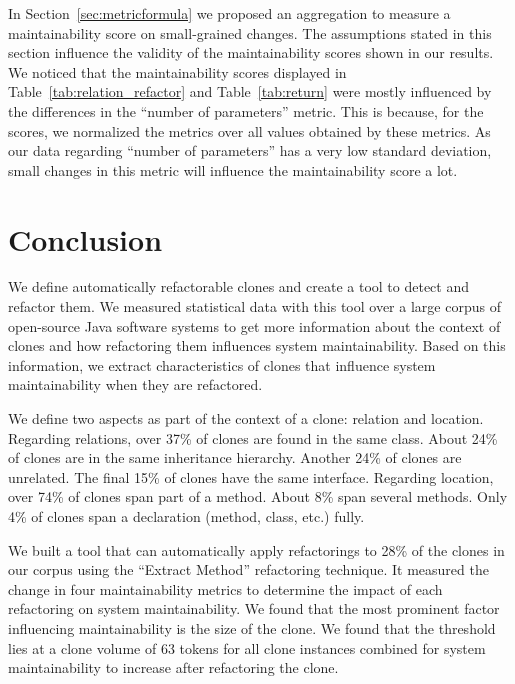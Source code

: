 \documentclass[sigconf,review,anonymous]{acmart}
\begin{document}
In Section~\ref{sec:metricformula} we proposed an aggregation to measure a maintainability score on small-grained changes. The assumptions stated in this section influence the validity of the maintainability scores shown in our results. We noticed that the maintainability scores displayed in Table~\ref{tab:relation_refactor} and Table~\ref{tab:return} were mostly influenced by the differences in the ``number of parameters'' metric. This is because, for the scores, we normalized the metrics over all values obtained by these metrics. As our data regarding ``number of parameters'' has a very low standard deviation, small changes in this metric will influence the maintainability score a lot.

\section{Conclusion} \label{sec:conclusion}
We define automatically refactorable clones and create a tool to detect and refactor them. We measured statistical data with this tool over a large corpus of open-source Java software systems to get more information about the context of clones and how refactoring them influences system maintainability. Based on this information, we extract characteristics of clones that influence system maintainability when they are refactored.

We define two aspects as part of the context of a clone: relation and location. Regarding relations, over 37\% of clones are found in the same class. About 24\% of clones are in the same inheritance hierarchy. Another 24\% of clones are unrelated. The final 15\% of clones have the same interface. Regarding location, over 74\% of clones span part of a method. About 8\% span several methods. Only 4\% of clones span a declaration (method, class, etc.) fully.



We built a tool that can automatically apply refactorings to 28\% of the clones in our corpus using the ``Extract Method'' refactoring technique. It measured the change in four maintainability metrics to determine the impact of each refactoring on system maintainability. We found that the most prominent factor influencing maintainability is the size of the clone. We found that the threshold lies at a clone volume of 63 tokens for all clone instances combined for system maintainability to increase after refactoring the clone. 
\end{document}
